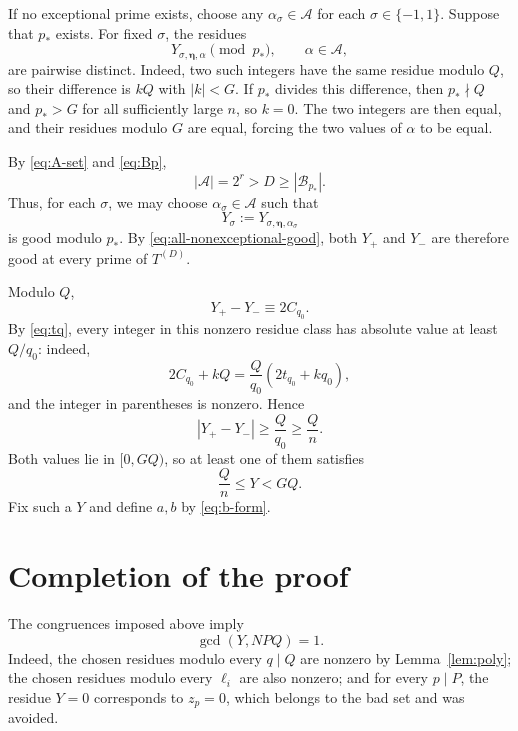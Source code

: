 \documentclass[11pt]{article}
\begin{document}
If no exceptional prime exists, choose any $\alpha_\sigma\in\mathcal A$ for each $\sigma\in\{-1,1\}$. Suppose that $p_*$ exists. For fixed $\sigma$, the residues
\[
  Y_{\sigma,\boldsymbol\eta,\alpha}\pmod{p_*},
  \qquad \alpha\in\mathcal A,
\]
are pairwise distinct. Indeed, two such integers have the same residue modulo $Q$, so their difference is $kQ$ with $|k|<G$. If $p_*$ divides this difference, then $p_*\nmid Q$ and $p_*>G$ for all sufficiently large $n$, so $k=0$. The two integers are then equal, and their residues modulo $G$ are equal, forcing the two values of $\alpha$ to be equal.

By \eqref{eq:A-set} and \eqref{eq:Bp},
\[
  |\mathcal A|=2^r>D\geq|\mathcal B_{p_*}|.
\]
Thus, for each $\sigma$, we may choose $\alpha_\sigma\in\mathcal A$ such that
\[
  Y_\sigma:=Y_{\sigma,\boldsymbol\eta,\alpha_\sigma}
\]
is good modulo $p_*$. By \eqref{eq:all-nonexceptional-good}, both $Y_+$ and $Y_-$ are therefore good at every prime of $T^{(D)}$.

Modulo $Q$,
\[
  Y_+-Y_-\equiv2C_{q_0}.
\]
By \eqref{eq:tq}, every integer in this nonzero residue class has absolute value at least $Q/q_0$: indeed,
\[
  2C_{q_0}+kQ
  =\frac{Q}{q_0}(2t_{q_0}+kq_0),
\]
and the integer in parentheses is nonzero. Hence
\[
  |Y_+-Y_-|\geq\frac{Q}{q_0}\geq\frac Qn.
\]
Both values lie in $[0,GQ)$, so at least one of them satisfies
\begin{equation}\label{eq:Y-size}
  \frac Qn\leq Y<GQ.
\end{equation}
Fix such a $Y$ and define $a,b$ by \eqref{eq:b-form}.

\section{Completion of the proof}

The congruences imposed above imply
\begin{equation}\label{eq:Y-coprime}
  \gcd(Y,NPQ)=1.
\end{equation}
Indeed, the chosen residues modulo every $q\mid Q$ are nonzero by Lemma~\ref{lem:poly}; the chosen residues modulo every $\ell_i$ are also nonzero; and for every $p\mid P$, the residue $Y=0$ corresponds to $z_p=0$, which belongs to the bad set and was avoided.
\end{document}
